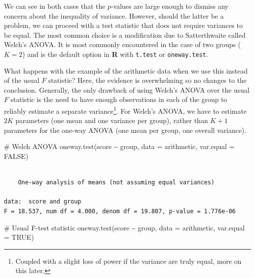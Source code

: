 \documentclass[
  11pt,
  letterpaper,
]{scrbook}
\newenvironment{Shaded}{\begin{snugshade}}{\end{snugshade}}
\newcommand{\AttributeTok}[1]{\textcolor[rgb]{0.40,0.45,0.13}{#1}}
\newcommand{\CommentTok}[1]{\textcolor[rgb]{0.37,0.37,0.37}{#1}}
\newcommand{\ConstantTok}[1]{\textcolor[rgb]{0.56,0.35,0.01}{#1}}
\newcommand{\FunctionTok}[1]{\textcolor[rgb]{0.28,0.35,0.67}{#1}}
\newcommand{\NormalTok}[1]{\textcolor[rgb]{0.00,0.23,0.31}{#1}}
\newcommand{\SpecialCharTok}[1]{\textcolor[rgb]{0.37,0.37,0.37}{#1}}
\theoremstyle{definition}
\theoremstyle{definition}
\theoremstyle{remark}
\begin{document}
We can see in both cases that the \(p\)-values are large enough to
dismiss any concern about the inequality of variance. However, should
the latter be a problem, we can proceed with a test statistic that does
not require variances to be equal. The most common choice is a
modification due to Satterthwaite called Welch's ANOVA. It is most
commonly encountered in the case of two groups (\(K=2\)) and is the
default option in \textbf{R} with \texttt{t.test} or
\texttt{oneway.test}.

What happens with the example of the arithmetic data when we use this
instead of the usual \(F\) statistic? Here, the evidence is overwhelming
so no changes to the conclusion. Generally, the only drawback of using
Welch's ANOVA over the usual \(F\) statistic is the need to have enough
observations in each of the group to reliably estimate a separate
variance\footnote{Coupled with a slight loss of power if the variance
  are truly equal, more on this later.}. For Welch's ANOVA, we have to
estimate \(2K\) parameters (one mean and one variance per group), rather
than \(K+1\) parameters for the one-way ANOVA (one mean per group, one
overall variance).

\begin{Shaded}
\begin{Highlighting}[]
\CommentTok{\# Welch ANOVA}
\FunctionTok{oneway.test}\NormalTok{(score }\SpecialCharTok{\textasciitilde{}}\NormalTok{ group, }\AttributeTok{data =}\NormalTok{ arithmetic, }
            \AttributeTok{var.equal =} \ConstantTok{FALSE}\NormalTok{)}
\end{Highlighting}
\end{Shaded}

\begin{verbatim}

    One-way analysis of means (not assuming equal variances)

data:  score and group
F = 18.537, num df = 4.000, denom df = 19.807, p-value = 1.776e-06
\end{verbatim}

\begin{Shaded}
\begin{Highlighting}[]
\CommentTok{\# Usual F{-}test statistic}
\FunctionTok{oneway.test}\NormalTok{(score }\SpecialCharTok{\textasciitilde{}}\NormalTok{ group, }\AttributeTok{data =}\NormalTok{ arithmetic, }
            \AttributeTok{var.equal =} \ConstantTok{TRUE}\NormalTok{)}
\end{Highlighting}
\end{Shaded}
\end{document}
